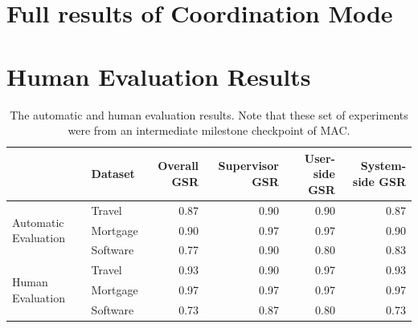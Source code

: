 \section{Full results of Coordination Mode}
\label{app:full}



\section{Human Evaluation Results}
\label{app:human_eval}
\begin{table}[H]
    \caption{The automatic and human evaluation results. Note that these set of experiments were from an intermediate milestone checkpoint of MAC.}
    \label{tab:human_eval_results}
    \centering
    \footnotesize
    \begin{tabular}{llrrrr}
    \toprule
    & Dataset & Overall GSR & Supervisor GSR & User-side GSR & System-side GSR \\
    \midrule 
    \multirow{3}{*}{Automatic Evaluation} & Travel & 0.87 & 0.90 & 0.90 & 0.87 \\
    & Mortgage & 0.90 & 0.97 & 0.97 & 0.90 \\
    & Software & 0.77 & 0.90 & 0.80 & 0.83 \\
    \midrule
    \multirow{3}{*}{Human Evaluation} & Travel & 0.93 & 0.90 & 0.97 & 0.93 \\
    & Mortgage & 0.97 & 0.97 & 0.97 & 0.97 \\
    & Software & 0.73 & 0.87 & 0.80 & 0.73 \\
    \bottomrule
    \end{tabular}
\end{table}

